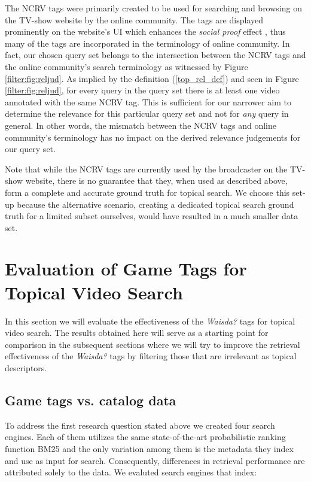 The NCRV tags were primarily created to be used for searching and browsing on the TV-show website by the online community. The tags are displayed prominently on the website's UI which enhances the \textit{social proof} effect \cite{Floeck:social-proof,golder2006usage}, thus many of the tags are incorporated in the terminology of online community. In fact, our chosen query set belongs to the intersection between the NCRV tags and the online community's search terminology as witnessed by Figure \ref{filter:fig:reljud}. 
As implied by the definition (\ref{top_rel_def}) and seen in Figure \ref{filter:fig:reljud}, for every query in the query set there is at least one video annotated with the same NCRV tag.
This is sufficient for our narrower aim to determine the relevance for this particular query set and not for \textit{any} query in general. In other words, the mismatch between the NCRV tags and online community's terminology has no impact on the derived relevance judgements for our query set.

Note that while the NCRV tags are currently used by the broadcaster on the TV-show website, there is no guarantee that they, when used as described above, form a complete and accurate ground truth for topical search. We choose this set-up  because the alternative scenario, creating a dedicated topical search ground truth for a limited subset ourselves, would have resulted in a much smaller data set.

\section{Evaluation of Game Tags for Topical Video Search} \label{sec:topicir-filter:all-tags}
In this section we will evaluate the effectiveness of the \textit{Waisda?} tags for topical video search. The results obtained here will serve as a starting point for comparison in the subsequent sections where we will try to improve the retrieval effectiveness of the \textit{Waisda?} tags by filtering those that are irrelevant as topical descriptors.

\subsection{Game tags vs. catalog data}\label{filter:sec:ses}
To address the first research question stated above we created four search engines. Each of them utilizes the same state-of-the-art probabilistic ranking function BM25 and the only variation among them is the metadata they index and use as input for search. Consequently, differences in retrieval performance are attributed solely to the data. We evaluted search engines that index:

